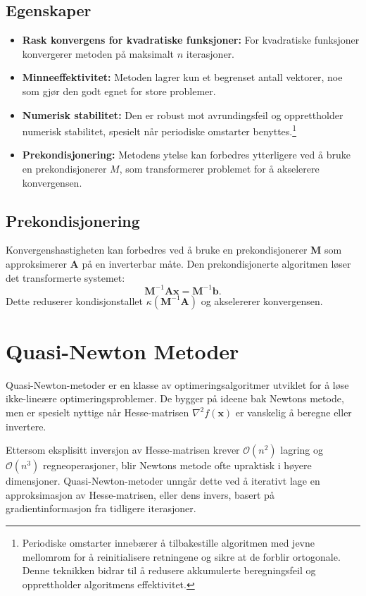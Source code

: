 \subsection{Egenskaper}
\begin{itemize}
	\item \textbf{Rask konvergens for kvadratiske funksjoner:}
	      For kvadratiske funksjoner konvergerer metoden på maksimalt \(n\) iterasjoner.
	\item \textbf{Minneeffektivitet:}
	      Metoden lagrer kun et begrenset antall vektorer, noe som gjør den godt egnet for store problemer.
	\item \textbf{Numerisk stabilitet:}
	      Den er robust mot avrundingsfeil og opprettholder numerisk stabilitet, spesielt når periodiske omstarter benyttes.\footnote{Periodiske omstarter innebærer å tilbakestille algoritmen med jevne mellomrom for å reinitialisere retningene og sikre at de forblir ortogonale. Denne teknikken bidrar til å redusere akkumulerte beregningsfeil og opprettholder algoritmens effektivitet.}
	\item \textbf{Prekondisjonering:}
	      Metodens ytelse kan forbedres ytterligere ved å bruke en prekondisjonerer \(M\), som transformerer problemet for å akselerere konvergensen.
\end{itemize}

\subsection{Prekondisjonering}
Konvergenshastigheten kan forbedres ved å bruke en prekondisjonerer \(\symbf{M}\) som approksimerer \(\symbf{A}\) på en inverterbar måte. Den prekondisjonerte algoritmen løser det transformerte systemet:
\[
	\symbf{M}^{-1}\symbf{A}\symbf{x} = \symbf{M}^{-1}\symbf{b}.
\]
Dette reduserer kondisjonstallet \(\kappa(\symbf{M}^{-1}\symbf{A})\) og akselererer konvergensen.

\section{Quasi-Newton Metoder}
\label{sec:quasi_newton}

Quasi-Newton-metoder er en klasse av optimeringsalgoritmer utviklet for å løse ikke-lineære optimeringsproblemer. De bygger på ideene bak Newtons metode, men er spesielt nyttige når Hesse-matrisen \( \nabla^2 f(\symbf{x}) \) er vanskelig å beregne eller invertere.

Ettersom eksplisitt inversjon av Hesse-matrisen krever \( \mathcal{O}(n^2) \) lagring og \( \mathcal{O}(n^3) \) regneoperasjoner, blir Newtons metode ofte upraktisk i høyere dimensjoner.
Quasi-Newton-metoder unngår dette ved å iterativt lage en approksimasjon av Hesse-matrisen, eller dens invers, basert på gradientinformasjon fra tidligere iterasjoner.


